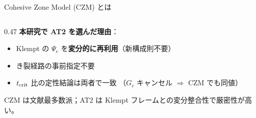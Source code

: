 \documentclass[
  ignorenonframetext,
  aspectratio=169,
]{beamer}
\begin{document}
\begin{frame}[shrink=15]{Cohesive Zone Model (CZM) とは}
\begin{columns}[T]
\begin{column}{0.47\textwidth}
\vspace{4pt}
\textbf{本研究で AT2 を選んだ理由}：
\begin{itemize}\setlength\itemsep{2pt}
\item Klempt の $\Psi_e$ を\textbf{変分的に再利用}（新構成則不要）
\item き裂経路の事前指定不要
\item $t_{\rm crit}$ 比の定性結論は両者で一致
      （$G_c$ キャンセル $\Rightarrow$ CZM でも同値）
\end{itemize}

{\footnotesize CZM は文献最多数派；AT2 は
Klempt フレームとの変分整合性で厳密性が高い。}
\end{column}
\end{columns}
\end{frame}
\end{document}
